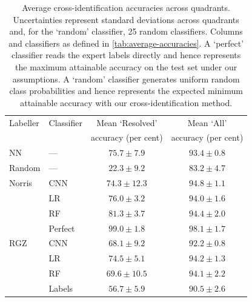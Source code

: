 \documentclass[fleqn,usenatbib,usedcolumn]{mnras}
\begin{document}
\begin{table}
  \caption{Average cross-identification accuracies across quadrants.
    Uncertainties represent standard deviations across quadrants and, for
    the `random' classifier, 25 random classifiers. Columns and
    classifiers as defined in \autoref{tab:average-accuracies}.  A
    `perfect' classifier reads the expert labels directly and hence
    represents the maximum attainable accuracy on the test set under our
    assumptions. A `random' classifier generates uniform random class
    probabilities and hence represents the expected minimum attainable
    accuracy with our cross-identification method.}
    \label{tab:cross-id-accuracies}
  \begin{tabular}{llcc}
    \hline
    Labeller & Classifier & Mean `Resolved' & Mean `All'\\
    && accuracy (per cent) & accuracy (per cent)\\
    \hline
      NN & --- & $75.7 \pm 7.9$ & $93.4 \pm 0.8$\\
      Random & --- & $22.3 \pm 9.2$ & $83.2 \pm 4.7$\\
      Norris & CNN & $74.3 \pm 12.3$ & $94.8 \pm 1.1$\\
       & LR & $76.0 \pm 3.2$ & $94.0 \pm 1.6$\\
       & RF & $81.3 \pm 3.7$ & $94.4 \pm 2.0$\\
       & Perfect & $99.0 \pm 1.8$ & $98.1 \pm 1.7$\\
      RGZ & CNN & $68.1 \pm 9.2$ & $92.2 \pm 0.8$\\
       & LR & $74.5 \pm 5.1$ & $94.2 \pm 1.3$\\
       & RF & $69.6 \pm 10.5$ & $94.1 \pm 2.2$\\
       & Labels & $56.7 \pm 5.9$ & $90.5 \pm 2.6$\\
    \hline
  \end{tabular}
\end{table}
\end{document}
